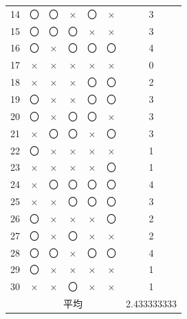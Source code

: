 \documentclass[12pt]{jarticle}
\begin{document}
\begin{table}
\begin{center}
\begin{tabular}[h]{|c|c|c|c|c|c|c|}
            14                    & 〇                         & 〇                          & ×  & 〇 & ×  & 3 \\
            15                    & 〇                         & 〇                          & 〇 & ×  & ×  & 3 \\
            16                    & 〇                         & ×                           & 〇 & 〇 & 〇 & 4 \\
            17                    & ×                          & ×                           & ×  & ×  & ×  & 0 \\
            18                    & ×                          & ×                           & ×  & 〇 & 〇 & 2 \\
            19                    & 〇                         & ×                           & ×  & 〇 & 〇 & 3 \\
            20                    & 〇                         & ×                           & 〇 & 〇 & ×  & 3 \\
            21                    & ×                          & 〇                          & 〇 & ×  & 〇 & 3 \\
            22                    & 〇                         & ×                           & ×  & ×  & ×  & 1 \\
            23                    & ×                          & ×                           & ×  & ×  & 〇 & 1 \\
            24                    & ×                          & 〇                          & 〇 & 〇 & 〇 & 4 \\
            25                    & ×                          & ×                           & 〇 & 〇 & 〇 & 3 \\
            26                    & 〇                         & ×                           & ×  & ×  & 〇 & 2 \\
            27                    & 〇                         & ×                           & 〇 & ×  & ×  & 2 \\
            28                    & 〇                         & 〇                          & ×  & 〇 & 〇 & 4 \\
            29                    & 〇                         & ×                           & ×  & ×  & ×  & 1 \\
            30                    & ×                          & ×                           & 〇 & ×  & ×  & 1 \\
            \hline
                                  & \multicolumn{5}{|c|}{平均} & 2.433333333                                    \\
            \hline
        \end{tabular}
    \end{center}
\end{table}
\clearpage
\end{document}
